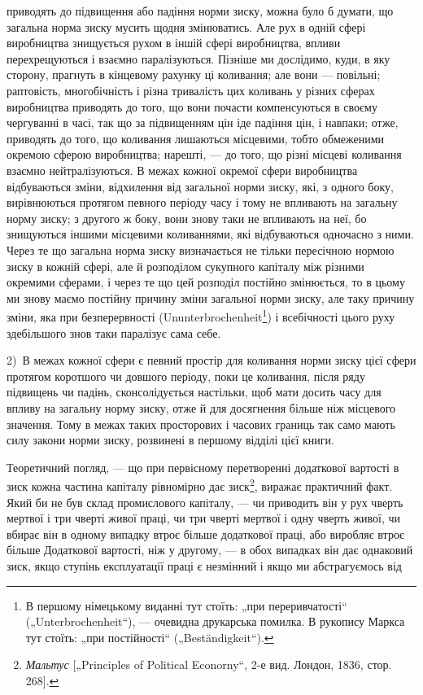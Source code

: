 \parcont{}  %
приводять до підвищення або падіння норми зиску, можна було б думати, що загальна норма зиску мусить
щодня змінюватись. Але рух в одній сфері виробництва знищується рухом в іншій сфері виробництва,
впливи перехрещуються і взаємно
паралізуються. Пізніше ми дослідимо, куди, в яку сторону, прагнуть в кінцевому рахунку ці коливання;
але вони — повільні;
раптовість, многобічність і різна тривалість цих коливань у
різних сферах виробництва приводять до того, що вони почасти компенсуються в своєму чергуванні в
часі, так що за
підвищенням цін іде падіння цін, і навпаки; отже, приводять до того, що коливання лишаються
місцевими, тобто обмеженими окремою сферою виробництва; нарешті, — до того, що різні місцеві
коливання взаємно нейтралізуються. В межах кожної окремої сфери виробництва відбуваються зміни,
відхилення
від загальної норми зиску, які, з одного боку, вирівнюються
протягом певного періоду часу і тому не впливають на загальну
норму зиску; з другого ж боку, вони знову таки не впливають
на неї, бо знищуються іншими місцевими коливаннями, які відбуваються одночасно з ними. Через те що
загальна норма зиску
визначається не тільки пересічною нормою зиску в кожній сфері,
але й розподілом сукупного капіталу між різними окремими
сферами, і через те що цей розподіл постійно змінюється, то
в цьому ми знову маємо постійну причину зміни загальної норми
зиску, але таку причину зміни, яка при безперервності (Ununterbrochenheit\footnote*{
В першому німецькому виданні тут стоїть: „при переривчатості“ („Unterbrochenheit“), — очевидна
друкарська помилка. В рукопису Маркса тут стоїть:
„при постійності“ („Beständigkeit“). 
}) і всебічності цього руху
здебільшого знов таки
паралізує сама себе.

2)~В межах кожної сфери є певний простір для коливання
норми зиску цієї сфери протягом коротшого чи довшого періоду, поки це коливання, після ряду
підвищень чи падінь,
сконсолідується настільки, щоб мати досить часу для впливу
на загальну норму зиску, отже й для досягнення більше ніж
місцевого значення. Тому в межах таких просторових і часових границь так само мають силу закони
норми зиску, розвинені в першому відділі цієї книги.

Теоретичний погляд, — що при первісному перетворенні додаткової вартості в зиск кожна частина
капіталу рівномірно
дає зиск\footnote{
\emph{Мальтус} [„Principles of Political Econorny“, 2-е вид. Лондон, 1836, стор. 268].
}, виражає практичний факт. Який би не був склад промислового капіталу, — чи приводить він
у рух чверть мертвої
і три чверті живої праці, чи три чверті мертвої і одну чверть
живої, чи вбирає він в одному випадку втроє більше додаткової
праці, або виробляє втроє більше Додаткової вартості, ніж у другому, — в обох випадках він дає
однаковий зиск, якщо ступінь
експлуатації праці є незмінний і якщо ми абстрагуємось від
\parbreak{}  %
